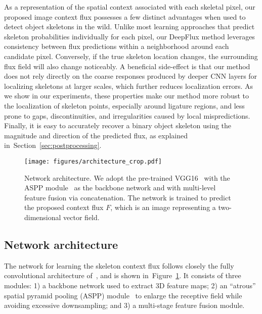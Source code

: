 \documentclass[10pt,twocolumn,letterpaper]{article}
\newcommand{\refsec}[1]{Section~\ref{#1}}
\newcommand{\reffig}[1]{Figure~\ref{#1}}
\begin{document}
As a representation of the spatial context associated with each skeletal pixel, our proposed image context flux possesses a few distinct advantages when used to detect object skeletons in the wild.
Unlike most learning approaches that predict skeleton probabilities individually for each pixel, our DeepFlux method leverages consistency between flux predictions within a neighborhood around each candidate pixel.
Conversely, if the true skeleton location changes, the surrounding flux field will also change noticeably.
A beneficial side-effect is that our method does not rely directly on the coarse responses produced by deeper CNN layers for localizing skeletons at larger scales, which further reduces localization errors.
As we show in our experiments, these properties make our method more robust to the localization of skeleton points, especially around ligature regions, and less prone to gaps, discontinuities, and irregularities caused by local mispredictions.
Finally, it is easy to accurately recover a binary object skeleton using the magnitude and direction of the predicted flux, as explained in~\refsec{sec:postprocessing}.






\begin{figure}
\centering
\texttt{[image: figures/architecture\_crop.pdf]}
\vskip 0.2cm
\caption{Network architecture. We adopt the pre-trained VGG16~\cite{vgg16network} with the ASPP module~\cite{chen2018deeplab} as the backbone network and with multi-level feature fusion via concatenation. The network is trained to predict the proposed context flux $F$, which is an image representing a two-dimensional vector field.}
\label{fig:networkarchitecture}
\end{figure}

\subsection{Network architecture} \label{sec:networkarchitecture}
The network for learning the skeleton context flux follows  closely the fully convolutional architecture of~\cite{long2015fcn}, and is shown in~\reffig{fig:networkarchitecture}.
It consists of three modules:
1) a backbone network used to extract 3D feature maps;
2) an ``atrous'' spatial pyramid pooling (ASPP) module~\cite{chen2018deeplab} to enlarge the receptive field while avoiding excessive downsampling; and
3) a multi-stage feature fusion module.
\end{document}
